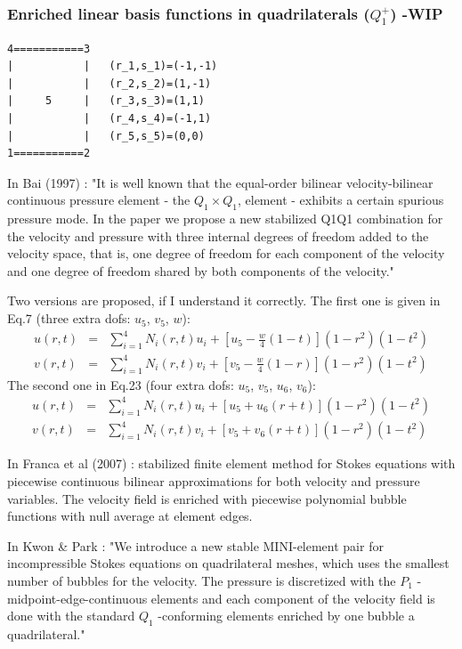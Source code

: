 \subsubsection{Enriched linear basis functions in quadrilaterals ($Q_1^+$) -WIP} \label{ss:quadmini}

\begin{verbatim}
4===========3
|           |   (r_1,s_1)=(-1,-1)
|           |   (r_2,s_2)=(1,-1)
|     5     |   (r_3,s_3)=(1,1)
|           |   (r_4,s_4)=(-1,1)
|           |   (r_5,s_5)=(0,0)
1===========2
\end{verbatim}

In Bai (1997) \cite{bai97}: "It is well known that the equal-order bilinear velocity-bilinear 
continuous pressure element - the $Q_1\times Q_1$, element - exhibits a certain spurious pressure mode.
In the paper we propose a new stabilized Q1Q1 combination for the velocity and
pressure with three internal degrees of freedom added to the velocity space, that is, one degree of
freedom for each component of the velocity and one degree of freedom shared by both components of
the velocity."

Two versions are proposed, if I understand it correctly.
The first one is given in Eq.7 (three extra dofs: $u_5$, $v_5$, $w$):
\begin{eqnarray}
u(r,t) &=& \sum_{i=1}^4 N_i (r,t) u_i + \left[ u_5 - \frac{w}{4}(1-t) \right] (1-r^2)(1-t^2) \nonumber\\
v(r,t) &=& \sum_{i=1}^4 N_i (r,t) v_i + \left[ v_5 - \frac{w}{4}(1-r) \right] (1-r^2)(1-t^2) 
\end{eqnarray}
The second one in Eq.23 (four extra dofs: $u_5$, $v_5$, $u_6$, $v_6$):
\begin{eqnarray}
u(r,t) &=& \sum_{i=1}^4 N_i (r,t) u_i + \left[ u_5 +u_6(r+t) \right] (1-r^2)(1-t^2) \nonumber\\
v(r,t) &=& \sum_{i=1}^4 N_i (r,t) v_i + \left[ v_5 +v_6(r+t) \right] (1-r^2)(1-t^2) 
\end{eqnarray}

In Franca et al (2007) \cite{fros07}: 
stabilized finite element method for Stokes equations with piecewise continuous 
bilinear approximations for both velocity and pressure variables. The velocity
field is enriched with piecewise polynomial bubble functions with null average at element
edges.

In Kwon \& Park \cite{kwpa14}: 
"We introduce a new stable MINI-element pair for incompressible Stokes equations on
quadrilateral meshes, which uses the smallest number of bubbles for the velocity. The pressure is 
discretized with the $P_1$ -midpoint-edge-continuous elements and each component of the velocity field is
done with the standard $Q_1$ -conforming elements enriched by one bubble a quadrilateral."


